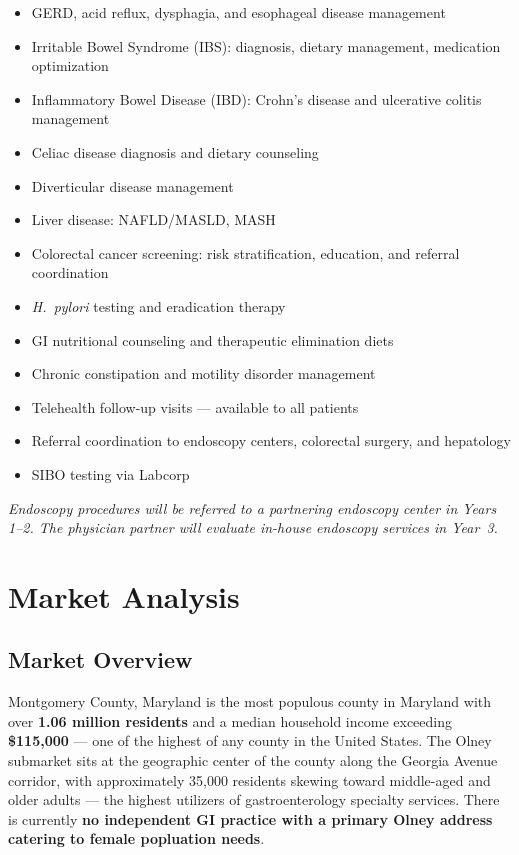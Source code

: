 \documentclass[11pt,letterpaper]{article}
\begin{document}
\begin{itemize}
  \item GERD, acid reflux, dysphagia, and esophageal disease management
  \item Irritable Bowel Syndrome (IBS): diagnosis, dietary management, medication optimization
  \item Inflammatory Bowel Disease (IBD): Crohn's disease and ulcerative colitis management
  \item Celiac disease diagnosis and dietary counseling
  \item Diverticular disease management
  \item Liver disease: NAFLD/MASLD, MASH
  \item Colorectal cancer screening: risk stratification, education, and referral coordination
  \item \textit{H.~pylori} testing and eradication therapy
  \item GI nutritional counseling and therapeutic elimination diets
  \item Chronic constipation and motility disorder management
  \item Telehealth follow-up visits --- available to all patients
  \item Referral coordination to endoscopy centers, colorectal surgery, and hepatology
  \item SIBO testing via Labcorp
\end{itemize}

\textit{Endoscopy procedures will be referred to a partnering endoscopy center in Years 1--2. The physician partner will evaluate in-house endoscopy services in Year~3.}

\newpage

\section{Market Analysis}

\subsection{Market Overview}

Montgomery County, Maryland is the most populous county in Maryland with over \textbf{1.06 million residents} and a median household income exceeding \textbf{\$115,000} --- one of the highest of any county in the United States. The Olney submarket sits at the geographic center of the county along the Georgia Avenue corridor, with approximately 35,000 residents skewing toward middle-aged and older adults --- the highest utilizers of gastroenterology specialty services. There is currently \textbf{no independent GI practice with a primary Olney address catering to female popluation needs}.
\end{document}
